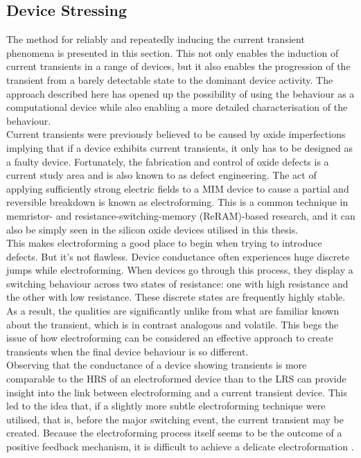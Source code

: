 \subsection[Device Stressing]{Device Stressing}

The method for reliably and repeatedly inducing the current transient phenomena is presented in this section. This not only enables the induction of current transients in a range of devices, but it also enables the progression of the transient from a barely detectable state to the dominant device activity. The approach described here has opened up the possibility of using the behaviour as a computational device while also enabling a more detailed characterisation of the behaviour. \\

\noindent Current transients were previously believed to be caused by oxide imperfections implying that if a device exhibits current transients, it only has to be designed as a faulty device. Fortunately, the fabrication and control of oxide defects is a current study area and is also known to as defect engineering. The act of applying sufficiently strong electric fields to a MIM device to cause a partial and reversible breakdown is known as electroforming. This is a common technique in memristor- and resistance-switching-memory (ReRAM)-based research, and it can also be simply seen in the silicon oxide devices utilised in this thesis.\\

\noindent This makes electroforming a good place to begin when trying to introduce defects. But it's not flawless. Device conductance often experiences huge discrete jumps while electroforming. When devices go through this process, they display a switching behaviour across two states of resistance: one with high resistance and the other with low resistance. These discrete states are frequently highly stable. As a result, the qualities are significantly unlike from what are familiar known about the transient, which is in contrast analogous and volatile. This begs the issue of how electroforming can be considered an effective approach to create transients when the final device behaviour is so different.\\


\noindent Observing that the conductance of a device showing transients is more comparable to the HRS of an electroformed device than to the LRS can provide insight into the link between electroforming and a current transient device. This led to the idea that, if a slightly more subtle electroforming technique were utilised, that is, before the major switching event, the current transient may be created. Because the electroforming process itself seems to be the outcome of a positive feedback mechanism, it is difficult to achieve a delicate electroformation \cite{kozicki2016electrochemical}.\\


